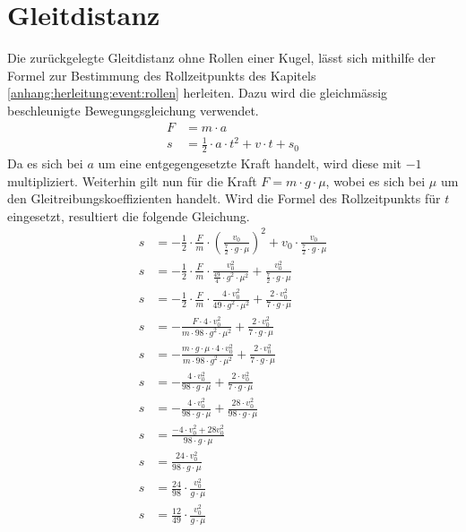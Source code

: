 \section{Gleitdistanz}\label{anhang:herleitung:gleitdistanz}
Die zurückgelegte Gleitdistanz ohne Rollen einer Kugel, lässt sich mithilfe der Formel zur Bestimmung des Rollzeitpunkts
des Kapitels \ref{anhang:herleitung:event:rollen} herleiten.
Dazu wird die gleichmässig beschleunigte Bewegungsgleichung verwendet.
\begin{align}
    F &= m \cdot a\\
    s &= \frac{1}{2} \cdot a \cdot t^2 + v \cdot t + s_0
\end{align}
Da es sich bei $a$ um eine entgegengesetzte Kraft handelt, wird diese mit $-1$ multipliziert. Weiterhin gilt nun für die
Kraft $F = m \cdot g \cdot \mu$, wobei es sich bei $\mu$ um den Gleitreibungskoeffizienten handelt. Wird die Formel des Rollzeitpunkts
für $t$ eingesetzt, resultiert die folgende Gleichung.
\begin{align}
    s &= -\frac{1}{2} \cdot \frac{F}{m} \cdot (\frac{v_0}{\frac{7}{2} \cdot g \cdot \mu})^2 + v_0 \cdot \frac{v_0}{\frac{7}{2} \cdot g \cdot \mu}\\
    s &= -\frac{1}{2} \cdot \frac{F}{m} \cdot \frac{v_0^2}{\frac{49}{4} \cdot g^2 \cdot \mu^2} + \frac{v_0^2}{\frac{7}{2} \cdot g \cdot \mu}\\
    s &= -\frac{1}{2} \cdot \frac{F}{m} \cdot \frac{4 \cdot v_0^2}{49 \cdot g^2 \cdot \mu^2} + \frac{2 \cdot v_0^2}{7 \cdot g \cdot \mu}\\
    s &= -\frac{F \cdot 4 \cdot v_0^2}{m \cdot 98 \cdot g^2 \cdot \mu^2} + \frac{2 \cdot v_0^2}{7 \cdot g \cdot \mu}\\
    s &= -\frac{m \cdot g \cdot \mu \cdot 4 \cdot v_0^2}{m \cdot 98 \cdot g^2 \cdot \mu^2} + \frac{2 \cdot v_0^2}{7 \cdot g \cdot \mu}\\
    s &= -\frac{4 \cdot v_0^2}{98 \cdot g \cdot \mu} + \frac{2 \cdot v_0^2}{7 \cdot g \cdot \mu}\\
    s &= -\frac{4 \cdot v_0^2}{98 \cdot g \cdot \mu} + \frac{28 \cdot v_0^2}{98 \cdot g \cdot \mu}\\
    s &= \frac{-4 \cdot v_0^2 + 28 v_0^2}{98 \cdot g \cdot \mu}\\
    s &= \frac{24 \cdot v_0^2}{98 \cdot g \cdot \mu}\\
    s &= \frac{24}{98} \cdot \frac{v_0^2}{g \cdot \mu}\\
    s &= \frac{12}{49} \cdot \frac{v_0^2}{g \cdot \mu}
\end{align}
